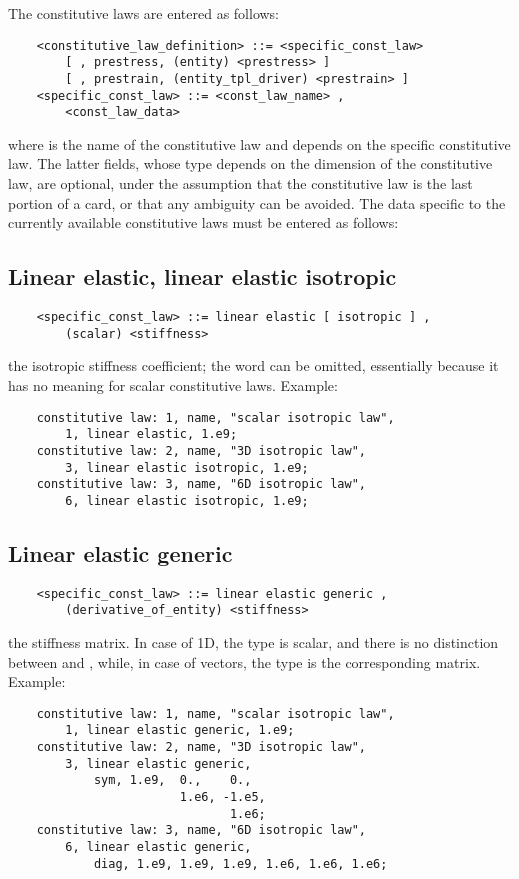 \noindent 
The constitutive laws are entered as follows:
\begin{verbatim}
    <constitutive_law_definition> ::= <specific_const_law>
        [ , prestress, (entity) <prestress> ]
        [ , prestrain, (entity_tpl_driver) <prestrain> ]
    <specific_const_law> ::= <const_law_name> ,
        <const_law_data>
\end{verbatim}
where  is the name of the constitutive law and
 depends on the specific constitutive law. 
The latter fields, whose type depends on the dimension of the
constitutive law, are optional, under the assumption that the
constitutive law is the last portion of a card, or that any ambiguity 
can be avoided.
The data specific to the currently available constitutive laws must be
entered as follows:


\subsection{Linear elastic, linear elastic isotropic}
\begin{verbatim}
    <specific_const_law> ::= linear elastic [ isotropic ] , 
        (scalar) <stiffness>
\end{verbatim}
the isotropic stiffness coefficient; the word 
can be omitted, essentially because it has no meaning
for scalar constitutive laws.
Example:
\begin{verbatim}
    constitutive law: 1, name, "scalar isotropic law",
        1, linear elastic, 1.e9;
    constitutive law: 2, name, "3D isotropic law",
        3, linear elastic isotropic, 1.e9;
    constitutive law: 3, name, "6D isotropic law",
        6, linear elastic isotropic, 1.e9;
\end{verbatim}
  
  
\subsection{Linear elastic generic}
\begin{verbatim}
    <specific_const_law> ::= linear elastic generic ,  
        (derivative_of_entity) <stiffness>
\end{verbatim}
the stiffness matrix. In case of 1D, the type is scalar, 
and there is no distinction between  and , 
while, in case of  vectors, the type is the corresponding 
 matrix.
Example:
\begin{verbatim}
    constitutive law: 1, name, "scalar isotropic law",
        1, linear elastic generic, 1.e9;
    constitutive law: 2, name, "3D isotropic law",
        3, linear elastic generic,
            sym, 1.e9,  0.,    0.,
                        1.e6, -1.e5,
                               1.e6;
    constitutive law: 3, name, "6D isotropic law",
        6, linear elastic generic,
            diag, 1.e9, 1.e9, 1.e9, 1.e6, 1.e6, 1.e6;
\end{verbatim}
  

